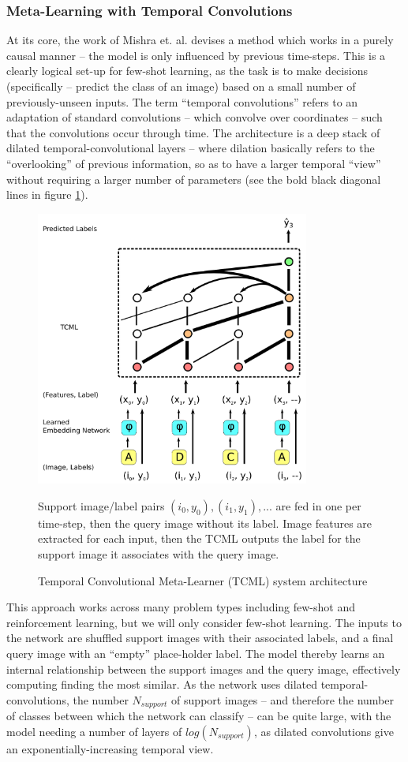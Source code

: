 \documentclass{report}
\begin{document}
	\subsubsection{Meta-Learning with Temporal Convolutions}
	At its core, the work of Mishra et. al. \parencite{mlwtc} devises a method which works in a purely causal manner -- the model is only influenced by previous time-steps. This is a clearly logical set-up for few-shot learning, as the task is to make decisions (specifically -- predict the class of an image) based on a small number of previously-unseen inputs. The term ``temporal convolutions'' refers to an adaptation of standard convolutions -- which convolve over coordinates -- such that the convolutions occur through time. The architecture is a deep stack of dilated temporal-convolutional layers -- where dilation basically refers to the ``overlooking'' of previous information, so as to have a larger temporal ``view'' without requiring a larger number of parameters (see the bold black diagonal lines in figure \ref{fig:temporal:1}). \par
	\begin{figure}[h]
		\centering
		\includegraphics[width=9cm]{temporal}
		\caption{Temporal Convolutional Meta-Learner (TCML) system architecture}
		\label{fig:temporal:1}
		Support image/label pairs $(i_0,y_0), (i_1,y_1), ...$ are fed in one per time-step, then the query image without its label. Image features are extracted for each input, then the TCML outputs the label for the support image it associates with the query image.
	\end{figure}
	This approach works across many problem types including few-shot and reinforcement learning, but we will only consider few-shot learning. The inputs to the network are shuffled support images with their associated labels, and a final query image with an ``empty'' place-holder label. The model thereby learns an internal relationship between the support images and the query image, effectively computing finding the most similar. As the network uses dilated temporal-convolutions, the number $N_{support}$ of support images -- and therefore the number of classes between which the network can classify -- can be quite large, with the model needing a number of layers of $log(N_{support})$, as dilated convolutions give an exponentially-increasing temporal view.  \par
\end{document}
